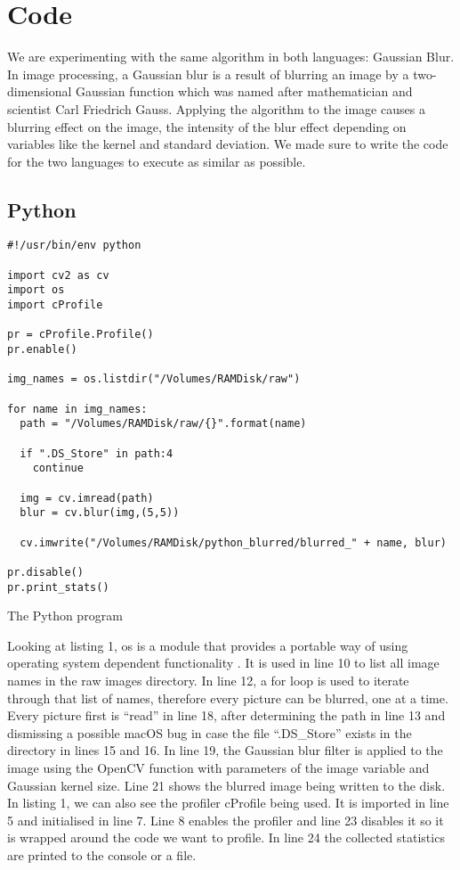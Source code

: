 \section{Code}
We are experimenting with the same algorithm in both languages: Gaussian Blur. In image processing, a Gaussian blur is a result of blurring an image by a two-dimensional Gaussian function which was named after mathematician and scientist Carl Friedrich Gauss. Applying the algorithm to the image causes a blurring effect on the image, the intensity of the blur effect depending on variables like the kernel and standard deviation. We made sure to write the code for the two languages to execute as similar as possible.

\subsection{Python}

\begin{listing}[!ht]
\begin{verbatim}
#!/usr/bin/env python

import cv2 as cv
import os
import cProfile

pr = cProfile.Profile()
pr.enable()

img_names = os.listdir("/Volumes/RAMDisk/raw")

for name in img_names:
  path = "/Volumes/RAMDisk/raw/{}".format(name)

  if ".DS_Store" in path:4
    continue

  img = cv.imread(path)
  blur = cv.blur(img,(5,5))

  cv.imwrite("/Volumes/RAMDisk/python_blurred/blurred_" + name, blur)

pr.disable()
pr.print_stats()
\end{verbatim}
\caption{The Python program}
\label{listing:python}
\end{listing}

Looking at listing 1, os is a module that provides a portable way of using operating system dependent functionality \cite{os}. It is used in line 10 to list all image names in the raw images directory. In line 12, a for loop is used to iterate through that list of names, therefore every picture can be blurred, one at a time. Every picture first is “read” in line 18, after determining the path in line 13 and dismissing a possible macOS bug in case the file “.DS\_Store” exists in the directory in lines 15 and 16. In line 19, the Gaussian blur filter is applied to the image using the OpenCV function with parameters of the image variable and Gaussian kernel size. Line 21 shows the blurred image being written to the disk.
In listing 1, we can also see the profiler cProfile being used. It is imported in line 5 and initialised in line 7. Line 8 enables the profiler and line 23 disables it so it is wrapped around the code we want to profile. In line 24 the collected statistics are printed to the console or a file.

